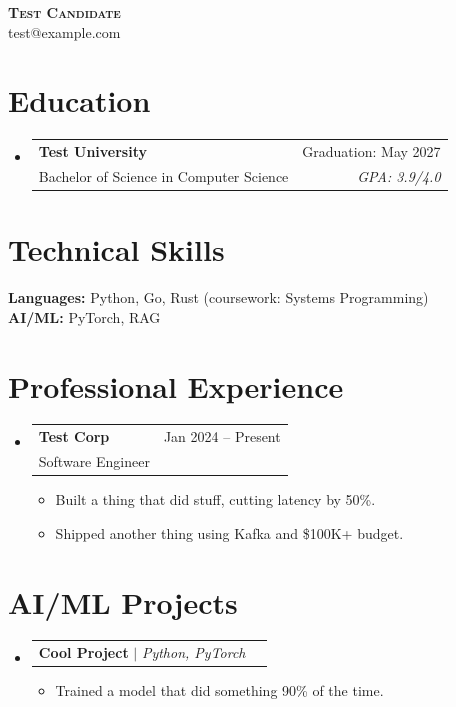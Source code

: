 \documentclass[letterpaper,11pt]{article}
\makeatletter
\newcommand{\resumeItem}[1]{
  \item\small{
    {#1 \vspace{-2pt}}
  }
}
\newcommand{\resumeSubheading}[4]{
  \vspace{-1pt}\item
    \begin{tabular*}{0.97\textwidth}[t]{l@{\extracolsep{\fill}}r}
      \textbf{#1} & #2 \\
      #3 & \textit{\small #4} \\
    \end{tabular*}\vspace{-5pt}
}
\newcommand{\resumeProjectHeading}[2]{
    \item
    \begin{tabular*}{0.97\textwidth}{l@{\extracolsep{\fill}}r}
      \small#1 & #2 \\
    \end{tabular*}\vspace{-7pt}
}
\newcommand{\resumeSubHeadingListStart}{\begin{itemize}[leftmargin=0.15in, label={}, itemsep=-2pt]}
\newcommand{\resumeSubHeadingListEnd}{\end{itemize}}
\newcommand{\resumeItemListStart}{\begin{itemize}[itemsep=-1pt]}
\newcommand{\resumeItemListEnd}{\end{itemize}\vspace{-4pt}}
\makeatother
\begin{document}
\begin{center}
    \textbf{\Huge \scshape Test Candidate} \\ \vspace{3pt}
    \small test@example.com
\end{center}

\section{Education}
\resumeSubHeadingListStart
    \resumeSubheading
      {Test University}{Graduation: May 2027}
      {Bachelor of Science in Computer Science}{GPA: 3.9/4.0}
\resumeSubHeadingListEnd

\section{Technical Skills}
\begin{itemize}[leftmargin=0.15in, label={}]
    \small{\item{
     \textbf{Languages:} Python, Go, Rust (coursework: Systems Programming) \\
     \textbf{AI/ML:} PyTorch, RAG
    }}
\end{itemize}

\section{Professional Experience}
\resumeSubHeadingListStart
    \resumeSubheading
      {Test Corp}{Jan 2024 -- Present}
      {Software Engineer}{}
      \resumeItemListStart
        \resumeItem{Built a thing that did stuff, cutting latency by 50\%.}
        \resumeItem{Shipped another thing using Kafka and \$100K+ budget.}
      \resumeItemListEnd
\resumeSubHeadingListEnd

\section{AI/ML Projects}
\resumeSubHeadingListStart
    \resumeProjectHeading
      {\textbf{Cool Project} $|$ \emph{Python, PyTorch}}{}
      \resumeItemListStart
        \resumeItem{Trained a model that did something 90\% of the time.}
      \resumeItemListEnd
\resumeSubHeadingListEnd
\end{document}
